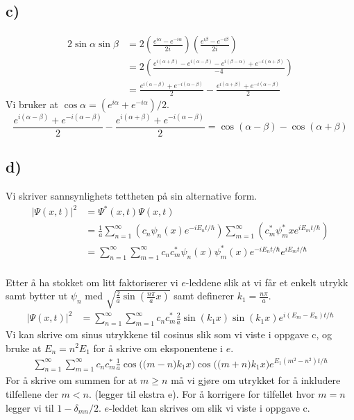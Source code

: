 \documentclass[norsk]{article}
\begin{document}
\subsection*{c)}\label{ssec: c}
\begin{align}
2\sin α \sin β &= 2  \left(\frac{e^{iα} - e^{-iα}}{2i}\right)  \left(\frac{e^{iβ} - e^{-iβ}}{2i}\right) \\
&= 2 \left(\frac{e^{i(α + β)}-e^{i(α-β)}-e^{i(β-α)}+ e^{-i(α + β)}}{-4}\right) \\ 
&= \frac{e^{i(α-β)}+e^{-i(α-β)}}{2} - \frac{e^{i(α+β)} + e^{-i(α-β)}}{2}
\end{align}
Vi bruker at $\cos α = (e^{iα} + e^{-iα}) / 2$. 
\begin{equation}\label{eq: e to cos}
\frac{e^{i(α-β)}+e^{-i(α-β)}}{2} - \frac{e^{i(α+β)} + e^{-i(α-β)}}{2} = \cos (α - β) - \cos (α + β)
\end{equation}


\subsection*{d)}
Vi skriver sannsynlighets tettheten på sin alternative form.
\begin{align}
\left|Ψ(x,t)\right|^2 &= Ψ^{*}(x,t)Ψ(x,t) \\
&= \frac{1}{a} \sum_{n=1}^{∞} \left(c_nψ_n(x) e^{-i E_n t / ℏ}\right) \sum_{m=1}^{∞}  \left(c_m^{*}ψ_m^{*}xe^{i E_m t / ℏ}\right) \\ 
&= ∑_{n=1}^{∞} ∑_{m=1}^{∞} c_n c_m^{*} ψ_n(x) ψ_m^{*}(x) e^{-i E_n t / ℏ} e^{i E_m t / ℏ} \\
\end{align}

Etter å ha stokket om litt faktoriserer vi $e$-leddene slik at vi får et enkelt utrykk samt bytter ut $ψ_n$ med $\displaystyle \sqrt{\frac{2}{a}\sin \left(\frac{nπ}{a}x\right)}$ samt definerer $ \displaystyle k_1 = \frac{nπ}{a}$.
\begin{align}
\left|Ψ(x,t)\right|^2 &= ∑_{n=1}^{∞} ∑_{m=1}^{∞} c_n c_m^{*} \frac{2}{a} \sin (k_1x)\sin (k_1x) e^{i(E_m - E_n )t / ℏ}
\end{align}
Vi kan skrive om sinus utrykkene til cosinus slik som vi viste i oppgave c, og bruke at $E_n = n^2E_1$ for å skrive om eksponentene i $e$. 
\begin{align}
∑_{n=1}^{∞} ∑_{m=1}^{∞} c_n c_m^{*} \frac{1}{a} \cos \Big(\big(m-n\big)k_1x\Big) \cos \Big(\big(m+n\big)k_1x\Big) e^{E_1(m^2 - n^2)t/ℏ}
\end{align}
For å skrive om summen for at $m \ge n$ må vi gjøre om utrykket for å inkludere tilfellene der $m<n$. (legger til ekstra e). For å korrigere for tilfellet hvor $m = n$ legger vi til $ 1 - δ_{mn} / 2$. $e$-leddet kan skrives om slik vi viste i oppgave c.
\end{document}
